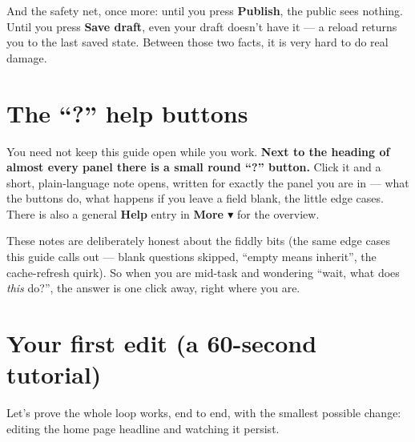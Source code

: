\documentclass[11pt]{article}
\begin{document}
And the safety net, once more: until you press \textbf{Publish}, the public sees
nothing. Until you press \textbf{Save draft}, even your draft doesn't have it --- a
reload returns you to the last saved state. Between those two facts, it is very hard to
do real damage.

\section{The ``?'' help buttons}

You need not keep this guide open while you work. \textbf{Next to the heading of
almost every panel there is a small round ``?'' button.} Click it and a short,
plain-language note opens, written for exactly the panel you are in --- what the
buttons do, what happens if you leave a field blank, the little edge cases. There is
also a general \textbf{Help} entry in \textbf{More $\blacktriangledown$} for the overview.

These notes are deliberately honest about the fiddly bits (the same edge cases this
guide calls out --- blank questions skipped, ``empty means inherit'', the
cache-refresh quirk). So when you are mid-task and wondering ``wait, what does
\emph{this} do?'', the answer is one click away, right where you are.

\section{Your first edit (a 60-second tutorial)}

Let's prove the whole loop works, end to end, with the smallest possible change:
editing the home page headline and watching it persist.
\end{document}
